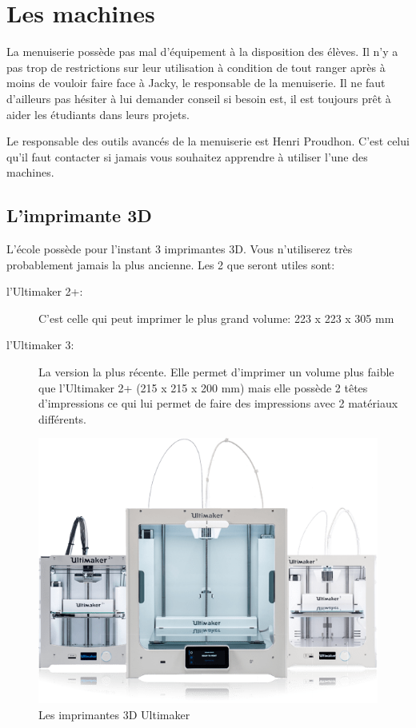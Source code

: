 \documentclass[a4paper, 11pt]{report}
\begin{document}
\chapter{Les machines}
La menuiserie possède pas mal d'équipement à la disposition des élèves. Il n'y a pas trop de restrictions sur leur utilisation à condition de tout ranger après à moins de vouloir faire face à Jacky, le responsable de la menuiserie. Il ne faut d'ailleurs pas hésiter à lui demander conseil si besoin est, il est toujours prêt à aider les étudiants dans leurs projets.

Le responsable des outils avancés de la menuiserie est Henri Proudhon. C'est celui qu'il faut contacter si jamais vous souhaitez apprendre à utiliser l'une des machines.

\section{L'imprimante 3D}
L'école possède pour l'instant 3 imprimantes 3D. Vous n'utiliserez très probablement jamais la plus ancienne. Les 2 que seront utiles sont:
\begin{description}
\item[l'Ultimaker 2+:]C'est celle qui peut imprimer le plus grand volume: 223 x 223 x 305 mm
\item[l'Ultimaker 3:]La version la plus récente. Elle permet d'imprimer un volume plus faible que l'Ultimaker 2+ (215 x 215 x 200 mm) mais elle possède 2 têtes d'impressions ce qui lui permet de faire des impressions avec 2 matériaux différents.
\end{description}

\begin{figure}[h!]
	\begin{center}
		\includegraphics[scale=0.6]{images/ultimaker.png}
		\caption{Les imprimantes 3D Ultimaker}
	\end{center}
\end{figure}
\end{document}
